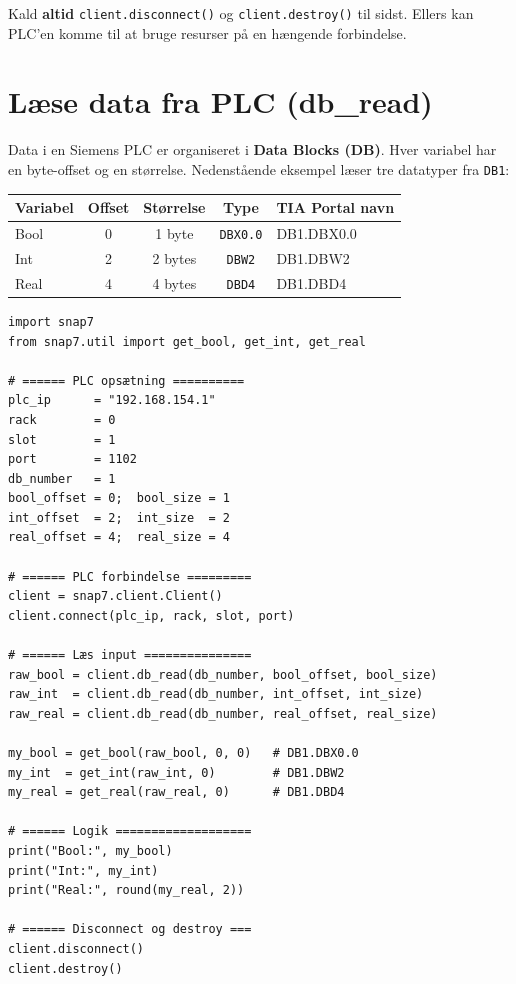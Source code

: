 \documentclass[12pt, a4paper]{article}
\begin{document}
\begin{tcolorbox}[tipbox, title={\faLightbulb\quad God praksis}]
Kald \textbf{altid} \texttt{client.disconnect()} og \texttt{client.destroy()} til sidst.
Ellers kan PLC'en komme til at bruge resurser på en hængende forbindelse.
\end{tcolorbox}

\clearpage
\section{Læse data fra PLC (db\_read)}

Data i en Siemens PLC er organiseret i \textbf{Data Blocks (DB)}.
Hver variabel har en byte-offset og en størrelse.
Nedenstående eksempel læser tre datatyper fra \texttt{DB1}:

\begin{center}
\begin{tabular}{lcccp{5cm}}
\toprule
\textbf{Variabel} & \textbf{Offset} & \textbf{Størrelse} & \textbf{Type} & \textbf{TIA Portal navn} \\
\midrule
Bool  & 0 & 1 byte & \texttt{DBX0.0} & DB1.DBX0.0 \\
Int   & 2 & 2 bytes & \texttt{DBW2} & DB1.DBW2 \\
Real  & 4 & 4 bytes & \texttt{DBD4} & DB1.DBD4 \\
\bottomrule
\end{tabular}
\end{center}

\begin{tcolorbox}[pythonbox, title={\faPython\quad Kode 2 — Læse Bool, Int og Real fra DB1}]
\begin{verbatim}
import snap7
from snap7.util import get_bool, get_int, get_real

# ====== PLC opsætning ==========
plc_ip      = "192.168.154.1"
rack        = 0
slot        = 1
port        = 1102
db_number   = 1
bool_offset = 0;  bool_size = 1
int_offset  = 2;  int_size  = 2
real_offset = 4;  real_size = 4

# ====== PLC forbindelse =========
client = snap7.client.Client()
client.connect(plc_ip, rack, slot, port)

# ====== Læs input ===============
raw_bool = client.db_read(db_number, bool_offset, bool_size)
raw_int  = client.db_read(db_number, int_offset, int_size)
raw_real = client.db_read(db_number, real_offset, real_size)

my_bool = get_bool(raw_bool, 0, 0)   # DB1.DBX0.0
my_int  = get_int(raw_int, 0)        # DB1.DBW2
my_real = get_real(raw_real, 0)      # DB1.DBD4

# ====== Logik ===================
print("Bool:", my_bool)
print("Int:", my_int)
print("Real:", round(my_real, 2))

# ====== Disconnect og destroy ===
client.disconnect()
client.destroy()
\end{verbatim}
\end{tcolorbox}
\end{document}
